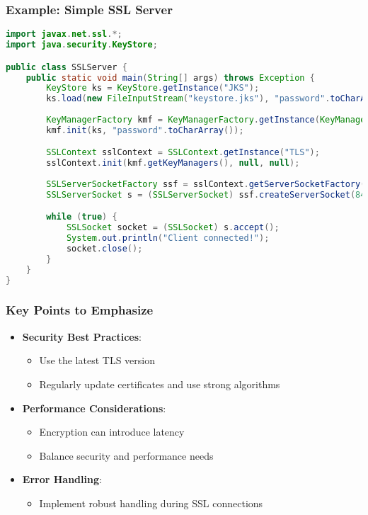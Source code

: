 \documentclass{beamer}
\begin{document}
\begin{frame}[fragile]
    \frametitle{Example: Simple SSL Server}
    \begin{lstlisting}[language=Java]
import javax.net.ssl.*;
import java.security.KeyStore;

public class SSLServer {
    public static void main(String[] args) throws Exception {
        KeyStore ks = KeyStore.getInstance("JKS");
        ks.load(new FileInputStream("keystore.jks"), "password".toCharArray());
        
        KeyManagerFactory kmf = KeyManagerFactory.getInstance(KeyManagerFactory.getDefaultAlgorithm());
        kmf.init(ks, "password".toCharArray());

        SSLContext sslContext = SSLContext.getInstance("TLS");
        sslContext.init(kmf.getKeyManagers(), null, null);
        
        SSLServerSocketFactory ssf = sslContext.getServerSocketFactory();
        SSLServerSocket s = (SSLServerSocket) ssf.createServerSocket(8443);

        while (true) {
            SSLSocket socket = (SSLSocket) s.accept();
            System.out.println("Client connected!");
            socket.close();
        }
    }
}
    \end{lstlisting}
\end{frame}

\begin{frame}
    \frametitle{Key Points to Emphasize}
    \begin{itemize}
        \item \textbf{Security Best Practices}:
            \begin{itemize}
                \item Use the latest TLS version
                \item Regularly update certificates and use strong algorithms
            \end{itemize}
        \item \textbf{Performance Considerations}:
            \begin{itemize}
                \item Encryption can introduce latency
                \item Balance security and performance needs
            \end{itemize}
        \item \textbf{Error Handling}:
            \begin{itemize}
                \item Implement robust handling during SSL connections
            \end{itemize}
    \end{itemize}
\end{frame}
\end{document}
